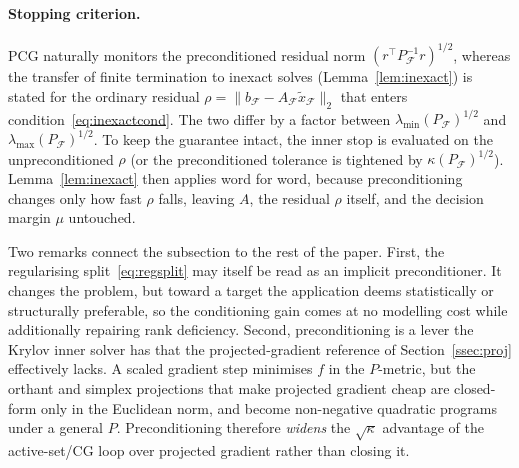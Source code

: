 \paragraph{Stopping criterion.}
PCG naturally monitors the preconditioned residual norm $(r^\top P_{\mathcal{F}}^{-1}
r)^{1/2}$, whereas the transfer of finite termination to inexact solves
(Lemma~\ref{lem:inexact}) is stated for the ordinary residual $\rho = \lVert b_{\mathcal{F}} -
A_{\mathcal{F}}\tilde x_{\mathcal{F}}\rVert_2$ that enters condition~\eqref{eq:inexactcond}.
The two differ by a factor between $\lambda_{\min}(P_{\mathcal{F}})^{1/2}$ and
$\lambda_{\max}(P_{\mathcal{F}})^{1/2}$. To keep the guarantee intact, the inner stop is
evaluated on the unpreconditioned $\rho$ (or the preconditioned tolerance is tightened by
$\kappa(P_{\mathcal{F}})^{1/2}$). Lemma~\ref{lem:inexact} then applies word for word, because
preconditioning changes only how fast $\rho$ falls, leaving $A$, the residual $\rho$ itself,
and the decision margin $\mu$ untouched.

Two remarks connect the subsection to the rest of the paper. First, the regularising
split~\eqref{eq:regsplit} may itself be read as an implicit preconditioner. It changes the
problem, but toward a target the application deems statistically or structurally preferable, so
the conditioning gain comes at no modelling cost while additionally repairing rank deficiency.
Second, preconditioning is a lever the Krylov inner solver has that the projected-gradient
reference of Section~\ref{ssec:proj} effectively lacks. A scaled gradient step minimises $f$ in
the $P$-metric, but the orthant and simplex projections that make projected gradient cheap are
closed-form only in the Euclidean norm, and become non-negative quadratic programs under a
general $P$. Preconditioning therefore \emph{widens} the $\sqrt\kappa$ advantage of the
active-set/CG loop over projected gradient rather than closing it.
